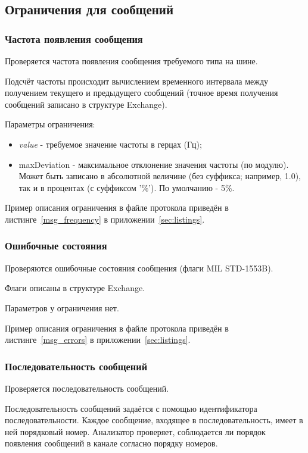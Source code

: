 \subsection{Ограничения для сообщений}

\subsubsection{Частота появления сообщения}

Проверяется частота появления сообщения требуемого типа на шине.

Подсчёт частоты происходит вычислением временного интервала между получением 
текущего и предыдущего сообщений (точное время получения сообщений записано в 
структуре Exchange).

Параметры ограничения:

\begin{itemize}
 \item \textit{value} - требуемое значение частоты в герцах (Гц);
 \item maxDeviation - максимальное отклонение значения частоты (по модулю).  
Может быть записано в абсолютной величине (без суффикса; например, 1.0), так и 
в процентах (с суффиксом '\%'). По умолчанию - 5\%.
\end{itemize}

Пример описания ограничения в файле протокола приведён в 
листинге~\ref{msg_frequency} в приложении~\ref{sec:listings}.

\subsubsection{Ошибочные состояния}

Проверяются ошибочные состояния сообщения (флаги MIL STD-1553B).

Флаги описаны в структуре Exchange.

Параметров у ограничения нет.

Пример описания ограничения в файле протокола приведён в 
листинге~\ref{msg_errors} в приложении~\ref{sec:listings}.


\subsubsection{Последовательность сообщений}

Проверяется последовательность сообщений.

Последовательность сообщений задаётся с помощью идентификатора 
последовательности. Каждое сообщение, входящее в последовательность, имеет в 
ней порядковый номер. Анализатор проверяет, соблюдается ли порядок появления 
сообщений в канале согласно порядку номеров.

